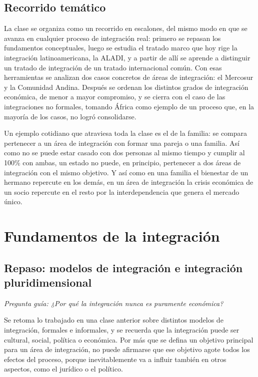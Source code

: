 \documentclass[12pt,oneside]{book}
\begin{document}
\section*{Recorrido temático}

La clase se organiza como un recorrido en escalones, del mismo modo en que se avanza en cualquier proceso de integración real: primero se repasan los fundamentos conceptuales, luego se estudia el tratado marco que hoy rige la integración latinoamericana, la ALADI, y a partir de allí se aprende a distinguir un tratado de integración de un tratado internacional común. Con esas herramientas se analizan dos casos concretos de áreas de integración: el Mercosur y la Comunidad Andina. Después se ordenan los distintos grados de integración económica, de menor a mayor compromiso, y se cierra con el caso de las integraciones no formales, tomando África como ejemplo de un proceso que, en la mayoría de los casos, no logró consolidarse.

Un ejemplo cotidiano que atraviesa toda la clase es el de la familia: se compara pertenecer a un área de integración con formar una pareja o una familia. Así como no se puede estar casado con dos personas al mismo tiempo y cumplir al 100\% con ambas, un estado no puede, en principio, pertenecer a dos áreas de integración con el mismo objetivo. Y así como en una familia el bienestar de un hermano repercute en los demás, en un área de integración la crisis económica de un socio repercute en el resto por la interdependencia que genera el mercado único.

\chapter{Fundamentos de la integración}

\section{Repaso: modelos de integración e integración pluridimensional}

\textit{Pregunta guía: ¿Por qué la integración nunca es puramente económica?}

Se retoma lo trabajado en una clase anterior sobre distintos modelos de integración, formales e informales, y se recuerda que la integración puede ser cultural, social, política o económica. Por más que se defina un objetivo principal para un área de integración, no puede afirmarse que ese objetivo agote todos los efectos del proceso, porque inevitablemente va a influir también en otros aspectos, como el jurídico o el político.
\end{document}
